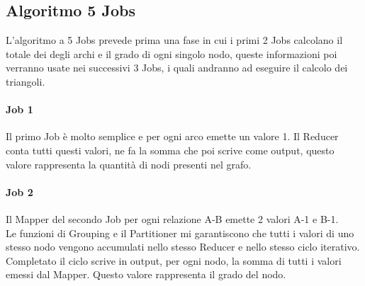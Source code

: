 \documentclass[paper=a4, fontsize=11pt]{scrartcl}	%
\numberwithin{equation}{section}															%
\numberwithin{figure}{section}																%
\numberwithin{table}{section}																%
\begin{document}
\subsection{Algoritmo 5 Jobs}
L'algoritmo a 5 Jobs prevede prima una fase in cui i primi 2 Jobs calcolano il totale dei degli archi e il grado di ogni singolo nodo, queste informazioni poi verranno usate nei successivi 3 Jobs, i quali andranno ad eseguire il calcolo dei triangoli.
\paragraph{Job 1}
Il primo Job è molto semplice e per ogni arco emette un valore 1. Il Reducer conta tutti questi valori, ne fa la somma che poi scrive come output, questo valore rappresenta la quantità di nodi presenti nel grafo.
\paragraph{Job 2}
Il Mapper del secondo Job per ogni relazione A-B emette 2 valori A-1 e B-1.\\
Le funzioni di Grouping e il Partitioner mi garantiscono che tutti i valori di uno stesso nodo vengono accumulati nello stesso Reducer e nello stesso ciclo iterativo. Completato il ciclo scrive in output, per ogni nodo, la somma di tutti i valori emessi dal Mapper. Questo valore rappresenta il grado del nodo.
\end{document}

